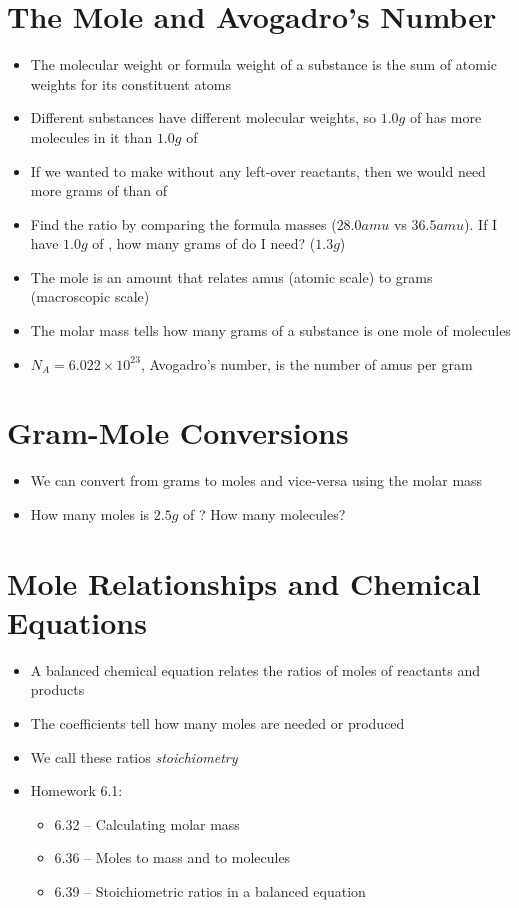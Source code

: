 \documentclass[12pt, openany, letterpaper]{memoir}
\begin{document}
\section{The Mole and Avogadro's Number}
\begin{itemize}
	\item The molecular weight or formula weight of a substance is the sum of atomic weights for its constituent atoms
	\item Different substances have different molecular weights, so $1.0g$ of  has more molecules in it than $1.0g$ of 
	\item If we wanted to make  without any left-over reactants, then we would need more grams of  than of 
	\item Find the ratio by comparing the formula masses ($28.0amu$ vs $36.5amu$). If I have $1.0g$ of , how many grams of  do I need? ($1.3g$)
	\item The mole is an amount that relates amus (atomic scale) to grams (macroscopic scale)
	\item The molar mass tells how many grams of a substance is one mole of molecules
	\item $N_A=6.022\times10^{23}$, Avogadro's number, is the number of amus per gram
\end{itemize}
\section{Gram-Mole Conversions}
\begin{itemize}
	\item We can convert from grams to moles and vice-versa using the molar mass
	\item How many moles is $2.5g$ of ? How many molecules?
\end{itemize}

\section{Mole Relationships and Chemical Equations}
\begin{itemize}
	\item A balanced chemical equation relates the ratios of moles of reactants and products
	\item The coefficients tell how many moles are needed or produced
	\item We call these ratios \emph{stoichiometry}
	\item Homework 6.1:
	      \begin{itemize}
		      \item 6.32 -- Calculating molar mass
		      \item 6.36 -- Moles to mass and to molecules
		      \item 6.39 -- Stoichiometric ratios in a balanced equation
	      \end{itemize}
\end{itemize}
\end{document}
